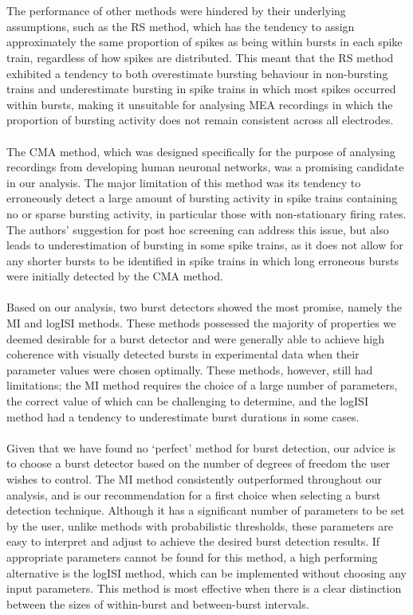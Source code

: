 \documentclass[12pt, titlepage]{article}
\begin{document}
	\\ \\The performance of other methods were hindered by their underlying assumptions, such as the RS method, which has the tendency to assign approximately the same proportion of spikes as being within bursts in each spike train, regardless of how spikes are distributed. This meant that the RS method exhibited a tendency to both overestimate bursting behaviour in non-bursting trains and underestimate bursting in spike trains in which most spikes occurred within bursts, making it unsuitable for analysing MEA recordings in which the proportion of bursting activity does not remain consistent across all electrodes.
	\\ \\The CMA method, which was designed specifically for the purpose of analysing recordings from developing human neuronal networks, was a promising candidate in our analysis. The major limitation of this method was its tendency to erroneously detect a large amount of bursting activity in spike trains containing no or sparse bursting activity, in particular those with non-stationary firing rates.  The authors' suggestion for post hoc screening can address this issue, but also leads to underestimation of bursting in some spike trains, as it does not allow for any shorter bursts to be identified in spike trains in which long erroneous bursts were initially detected by the CMA method. 
	\\ \\ Based on our analysis, two burst detectors showed the most promise, namely the MI and logISI methods. These methods possessed the majority of properties we deemed desirable for a burst detector and were generally able to achieve high coherence with visually detected bursts in experimental data when their parameter values were chosen optimally. These methods, however, still had limitations; the MI method requires the choice of a large number of parameters, the correct value of which can be challenging to determine, and the logISI method had a tendency to underestimate burst durations in some cases.
	\\ \\Given that we have found no `perfect' method for burst detection, our advice is to choose a burst detector based on the number of degrees of freedom the user wishes to control.
	The MI method consistently outperformed throughout our analysis, and is our recommendation for a first choice when selecting a burst detection technique. Although it has a significant number of parameters to be set by the user, unlike methods with probabilistic thresholds, these parameters are easy to interpret and adjust to achieve the desired burst detection results. If appropriate parameters cannot be found for this method, a high performing alternative is the logISI method, which can be implemented without choosing any input parameters. This method is most effective when there is a clear distinction between the sizes of within-burst and between-burst intervals. 
\end{document}
